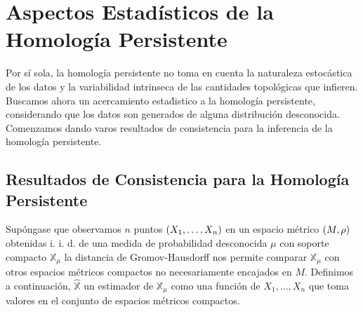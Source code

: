 \chapter{Aspectos Estad\'isticos de la Homolog\'ia Persistente}\label{chap:Cap5}

Por s\'i sola, la homolog\'ia persistente no toma en cuenta la naturaleza estoc\'astica de los datos
y la variabilidad intrinseca de las cantidades topol\'ogicas que infieren.
Buscamos ahora un acercamiento esta\'distico a la homolog\'ia persistente,
considerando que los datos son generados de alguna distribuci\'on desconocida.
Comenzamos dando varos resultados de consistencia para la inferencia de la homolog\'ia persistente.

\section{Resultados de Consistencia para la Homolog\'ia Persistente}

Sup\'ongase que observamos $n$ puntos $\left(X_{1},\dots,X_{n}\right)$ en un espacio m\'etrico
$\left(M,\rho\right)$ obtenidas i. i. d. de una medida de probabilidad desconocida $\mu$ con
soporte compacto $\mathbb{X}_{\mu}$ la distancia de Gromov-Hausdorff nos permite comparar
$\mathbb{X}_{\mu}$ con otros espacios m\'etricos compactos no necesariamente encajados en $M$.
Definimos a continuaci\'on, $\hat{\mathbb{X}}$ un estimador de $\mathbb{X}_{\mu}$
como una funci\'on de $X_{1},\dots,X_{n}$ que toma valores en el conjunto de espacios m\'etricos compactos.